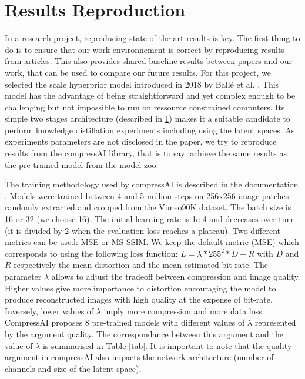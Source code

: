 \section{Results Reproduction}
In a research project, reproducing state-of-the-art results is key. The first thing to do is to ensure that our work environnement is correct by reproducing results from articles. This also provides shared baseline results between papers and our work, that can be used to compare our future results. For this project, we selected the scale hyperprior model introduced in 2018 by Ballé et al. \cite{ballé2018variationalimagecompressionscale}. This model has the advantage of being straightforward and yet complex enough to be challenging but not impossible to run on ressource constrained computers. Its simple two stages architecture (described in \ref{}) makes it a suitable candidate to perform knowledge distillation experiments including using the latent spaces. As experiments parameters are not disclosed in the paper, we try to reproduce results from the compressAI library, that is to say: achieve the same results as the pre-trained model from the model zoo.

The training methodology used by compressAI is described in the documentation \cite{compressai_train}. Models were trained between 4 and 5 million steps on 256x256 image patches randomly extracted and cropped from the Vimeo90K dataset. The batch size is 16 or 32 (we choose 16). The initial learning rate is 1e-4 and decreases over time (it is divided by 2 when the evaluation loss reaches a plateau). Two different metrics can be used: MSE or MS-SSIM. We keep the default metric (MSE) which corresponds to using the following loss function: \(L = \lambda * 255^{2} * D + R\) with \(D\) and \(R\) respectively the mean distortion and the mean estimated bit-rate. The parameter \(\lambda\) allows to adjust the tradeoff between compression and image quality. Higher values give more importance to distortion encouraging the model to produce reconstructed images with high quality at the expense of bit-rate. Inversely, lower values of \(\lambda\) imply more compression and more data loss. CompressAI proposes 8 pre-trained models with different values of \(\lambda\) represented by the argument \textsf{quality}. The correspondance between this argument and the value of \(\lambda\) is summarised in Table \ref{tab}. It is important to note that the \textsf{quality} argument in compressAI also impacts the network architecture (number of channels and size of the latent space).

